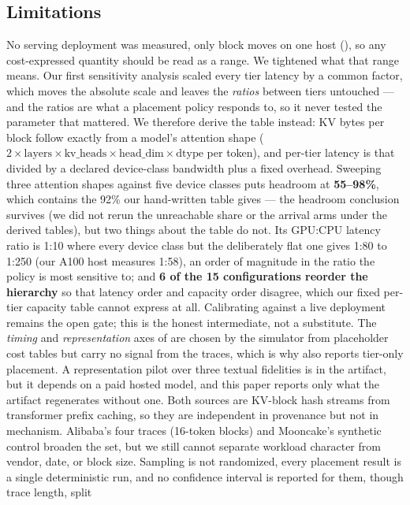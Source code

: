 \subsection{Limitations}
\label{sec:limits}
No serving deployment was measured, only block moves on one host (), so any
cost-expressed quantity should be read as a range.
We tightened what that range means. Our first sensitivity analysis scaled every tier latency by a common
factor, which moves the absolute scale and leaves the \emph{ratios} between tiers untouched --- and the
ratios are what a placement policy responds to, so it never tested the parameter that mattered. We
therefore derive the table instead: KV bytes per block follow exactly from a model's attention shape
($2 \times \text{layers} \times \text{kv\_heads} \times \text{head\_dim} \times \text{dtype}$ per
token), and per-tier latency is that divided by a declared device-class bandwidth plus a fixed overhead.
Sweeping three attention shapes against five device classes puts headroom at \textbf{55--98\%}, which
contains the 92\% our hand-written table gives --- the headroom conclusion survives (we did not rerun the
unreachable share or the arrival arms under the derived tables), but two things about the
table do not. Its GPU:CPU latency ratio is 1:10 where every device class but the deliberately flat one gives 1:80 to 1:250
(our A100 host measures 1:58), an order of magnitude in the ratio the policy is most sensitive to; and \textbf{6 of the 15 configurations reorder
the hierarchy} so that latency order and capacity order disagree, which our fixed per-tier capacity table
cannot express at all. Calibrating against a live deployment remains the open gate; this is the honest
intermediate, not a substitute. The
\emph{timing} and \emph{representation} axes of  are chosen by the simulator from
placeholder cost tables but carry no signal from the traces, which is why  also reports
tier-only placement. A
representation pilot over three textual fidelities is in the artifact, but it depends on
a paid hosted model, and this paper reports only what the artifact regenerates without one. Both
sources are KV-block hash streams from transformer prefix caching, so they are independent in provenance
but not in mechanism. Alibaba's four traces (16-token blocks) and Mooncake's synthetic control broaden the
set, but we still cannot separate workload character from vendor, date, or block size. Sampling is not randomized, every placement result is
a single deterministic run, and no confidence interval is reported for them, though trace length, split
